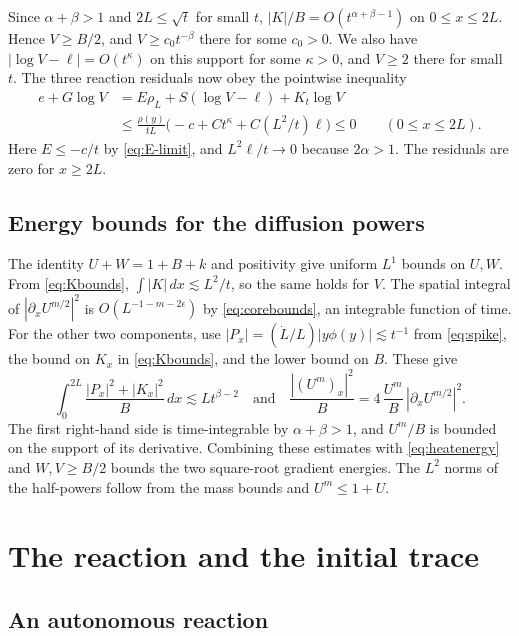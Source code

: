 \documentclass[11pt]{article}
\begin{document}
Since \(\alpha+\beta>1\) and \(2L\le\sqrt t\) for small \(t\),
\(|K|/B=O(t^{\alpha+\beta-1})\) on \(0\le x\le 2L\). Hence
\(V\ge B/2\), and \(V\ge c_0t^{-\beta}\) there for some \(c_0>0\).
We also have \(|\log V-\ell|=O(t^\kappa)\) on this support for
some \(\kappa>0\), and \(V\ge2\) there for small \(t\).
The three reaction residuals now obey the pointwise inequality
\begin{equation}
\begin{aligned}
 e+G\log V
 &=E\rho_L+S(\log V-\ell)+K_t\log V\\
 &\le \frac{\rho(y)}{tL}
   \bigl(-c+C t^\kappa+C(L^2/t)\ell\bigr)\le0
 \qquad (0\le x\le2L).
\end{aligned}
\label{eq:pointwiseentropy}
\end{equation}
Here \(E\le-c/t\) by \eqref{eq:E-limit}, and
\(L^2\ell/t\to0\) because \(2\alpha>1\).
The residuals are zero for \(x\ge2L\).

\subsection{Energy bounds for the diffusion powers}

The identity \(U+W=1+B+k\) and positivity give uniform \(L^1\)
bounds on \(U,W\). From \eqref{eq:Kbounds},
\(\int|K|\,dx\lesssim L^2/t\), so the same holds for \(V\).
The spatial integral of \(|\partial_x U^{m/2}|^2\) is
\(O(L^{-1-m-2\epsilon})\) by \eqref{eq:corebounds}, an integrable
function of time. For the other two components, use
\(|P_x|=(\dot L/L)|y\phi(y)|\lesssim t^{-1}\) from \eqref{eq:spike},
the bound on \(K_x\) in \eqref{eq:Kbounds}, and the lower bound on \(B\).
These give
\[
 \int_0^{2L}\frac{|P_x|^2+|K_x|^2}{B}\,dx
 \lesssim L t^{\beta-2}
 \quad\text{and}\quad
 \frac{|(U^m)_x|^2}{B}
   =4\,\frac{U^m}{B}\,|\partial_x U^{m/2}|^2 .
\]
The first right-hand side is time-integrable by
\(\alpha+\beta>1\), and \(U^m/B\) is bounded on the support
of its derivative. Combining these estimates with
\eqref{eq:heatenergy} and \(W,V\ge B/2\) bounds the two square-root
gradient energies. The \(L^2\) norms of the half-powers follow
from the mass bounds and \(U^m\le1+U\).

\section{The reaction and the initial trace}

\subsection{An autonomous reaction}
\end{document}
